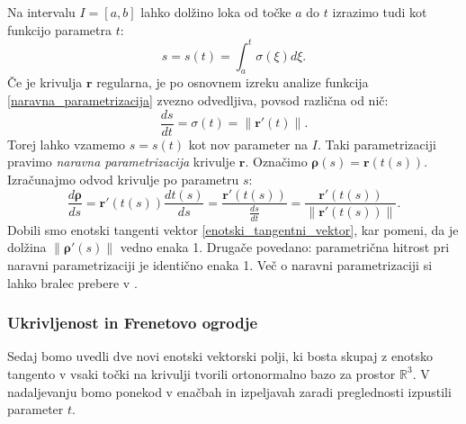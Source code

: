 \documentclass[12pt,a4paper,twoside]{article}
\theoremstyle{definition} %
\theoremstyle{plain} %
\theoremstyle{primerstyle}
\numberwithin{equation}{section}  %
\newcommand{\R}{\mathbb R}
\newcommand{\rV}{\mathbf{r}}
\newcommand{\brho}{\boldsymbol \rho}
\begin{document}
Na intervalu $I=[a,b]$ lahko dolžino loka od točke $a$ do $t$ izrazimo tudi kot funkcijo parametra $t:$
\begin{equation}
	\label{naravna_parametrizacija}
	s=s(t)=\int_a^t\sigma(\xi)d\xi.
\end{equation}
Če je krivulja $\rV$ regularna, je po osnovnem izreku analize funkcija \eqref{naravna_parametrizacija} zvezno odvedljiva, povsod različna od nič:
$$\frac{ds}{dt}=\sigma(t)=\lVert\rV'(t)\rVert.$$
Torej lahko vzamemo $s=s(t)$ kot nov parameter na $I.$ Taki parametrizaciji pravimo \emph{naravna parametrizacija} krivulje $\rV.$ Označimo $\brho(s)=\rV(t(s)).$ Izračunajmo odvod krivulje po parametru $s:$
$$\frac{d\brho}{ds}=\rV'(t(s))\frac{dt(s)}{ds}=\frac{\rV'(t(s))}{\frac{ds}{dt}}=\frac{\rV'(t(s))}{\lVert\rV'(t(s))\rVert}.$$
Dobili smo enotski tangenti vektor \eqref{enotski_tangentni_vektor}, kar pomeni, da je dolžina $\lVert\brho'(s)\rVert$ vedno enaka 1. Drugače povedano: parametrična hitrost pri naravni parametrizaciji je identično enaka 1. Več o naravni parametrizaciji si lahko bralec prebere v \cite[str. 51]{lipschutz1969schaum}.

\subsubsection{Ukrivljenost in Frenetovo ogrodje}

Sedaj bomo uvedli dve novi enotski vektorski polji, ki bosta skupaj z enotsko tangento v vsaki točki na krivulji tvorili ortonormalno bazo za prostor $\R^3.$ V nadaljevanju bomo ponekod v enačbah in izpeljavah zaradi preglednosti izpustili parameter $t.$
\end{document}
